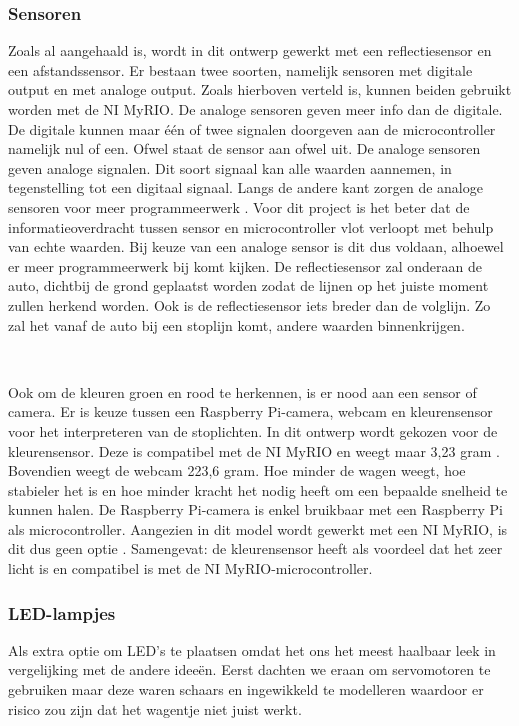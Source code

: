 \documentclass[a4paper,twoside,kulak]{kulakreport} %
\begin{document}
\label{Microcontroller}

\subsubsection{Sensoren} \label{Sensoren}
Zoals al aangehaald is, wordt in dit ontwerp gewerkt met een reflectiesensor en een afstandssensor. Er bestaan twee soorten, namelijk sensoren met digitale output en met analoge output. Zoals hierboven verteld is, kunnen beiden gebruikt worden met de NI MyRIO. De analoge sensoren geven meer info dan de digitale. De digitale kunnen maar één of twee signalen doorgeven aan de microcontroller namelijk nul of een. Ofwel staat de sensor aan ofwel uit. De analoge sensoren geven analoge signalen. Dit soort signaal kan alle waarden aannemen, in tegenstelling tot een digitaal signaal. Langs de andere kant zorgen de analoge sensoren voor meer programmeerwerk \cite{DigitaalOfAnaloog}. Voor dit project is het beter dat de informatieoverdracht tussen sensor en microcontroller vlot verloopt met behulp van echte waarden. Bij keuze van een analoge sensor is dit dus voldaan, alhoewel er meer programmeerwerk bij komt kijken. %
De reflectiesensor zal onderaan de auto, dichtbij de grond geplaatst worden zodat de lijnen op het juiste moment zullen herkend worden. Ook is de reflectiesensor iets breder dan de volglijn. Zo zal het vanaf de auto bij een stoplijn komt, andere waarden binnenkrijgen.

~

Ook om de kleuren groen en rood te herkennen, is er nood aan een sensor of camera. Er is keuze tussen een Raspberry Pi-camera, webcam en kleurensensor voor het interpreteren van de stoplichten. In dit ontwerp wordt gekozen voor de kleurensensor. Deze is compatibel met de NI MyRIO en weegt maar 3,23 gram \cite{Webcam,TCS34725KleurSensorBOB}. Bovendien weegt de webcam 223,6 gram. Hoe minder de wagen weegt, hoe stabieler het is en hoe minder kracht het nodig heeft om een bepaalde snelheid te kunnen halen. De Raspberry Pi-camera is enkel bruikbaar met een Raspberry Pi als microcontroller. Aangezien in dit model wordt gewerkt met een NI MyRIO, is dit dus geen optie \cite{RPi-camera}. Samengevat: de kleurensensor heeft als voordeel dat het zeer licht is en compatibel is met de NI MyRIO-microcontroller. %



\subsubsection{LED-lampjes}\label{LED-lampjes}
Als extra optie om LED's te plaatsen omdat het ons het meest haalbaar leek in vergelijking met de andere ideeën. Eerst dachten we eraan om servomotoren te gebruiken maar deze waren schaars en ingewikkeld te modelleren waardoor er risico zou zijn dat het wagentje niet juist werkt.
\end{document}
